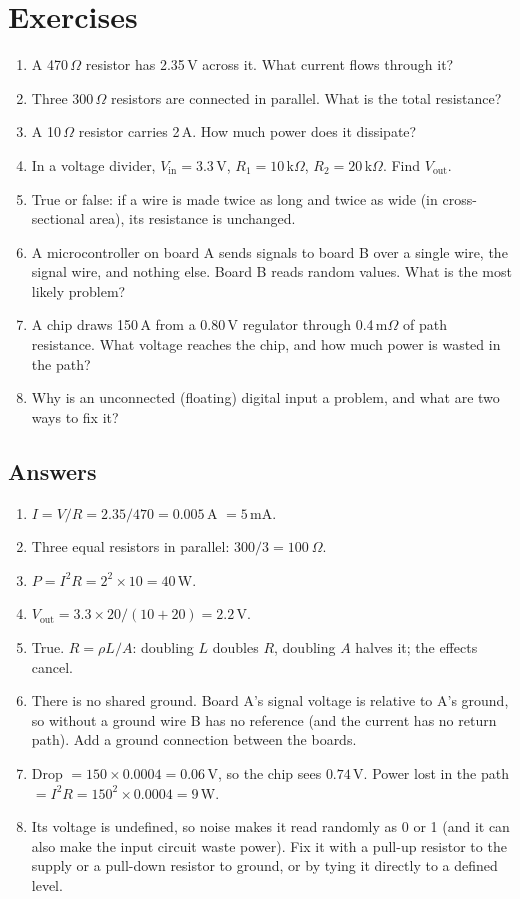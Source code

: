 \section{Exercises}

\begin{enumerate}
  \item A 470\,$\Omega$ resistor has 2.35\,V across it. What current flows through it?
  \item Three 300\,$\Omega$ resistors are connected in parallel. What is the total resistance?
  \item A 10\,$\Omega$ resistor carries 2\,A. How much power does it dissipate?
  \item In a voltage divider, $V_{\text{in}} = 3.3$\,V, $R_1 = 10$\,k$\Omega$, $R_2 = 20$\,k$\Omega$. Find $V_{\text{out}}$.
  \item True or false: if a wire is made twice as long and twice as wide (in cross-sectional area), its resistance is unchanged.
  \item A microcontroller on board A sends signals to board B over a single wire, the signal wire, and nothing else. Board B reads random values. What is the most likely problem?
  \item A chip draws 150\,A from a 0.80\,V regulator through 0.4\,m$\Omega$ of path resistance. What voltage reaches the chip, and how much power is wasted in the path?
  \item Why is an unconnected (floating) digital input a problem, and what are two ways to fix it?
\end{enumerate}

\subsection*{Answers}
\begin{enumerate}
  \item $I = V/R = 2.35/470 = 0.005$\,A $= 5$\,mA.
  \item Three equal resistors in parallel: $300/3 = 100~\Omega$.
  \item $P = I^2R = 2^2 \times 10 = 40$\,W.
  \item $V_{\text{out}} = 3.3 \times 20/(10+20) = 2.2$\,V.
  \item True. $R = \rho L/A$: doubling $L$ doubles $R$, doubling $A$ halves it; the effects cancel.
  \item There is no shared ground. Board A's signal voltage is relative to A's ground, so without a ground wire B has no reference (and the current has no return path). Add a ground connection between the boards.
  \item Drop $= 150 \times 0.0004 = 0.06$\,V, so the chip sees $0.74$\,V. Power lost in the path $= I^2R = 150^2 \times 0.0004 = 9$\,W.
  \item Its voltage is undefined, so noise makes it read randomly as 0 or 1 (and it can also make the input circuit waste power). Fix it with a pull-up resistor to the supply or a pull-down resistor to ground, or by tying it directly to a defined level.
\end{enumerate}
